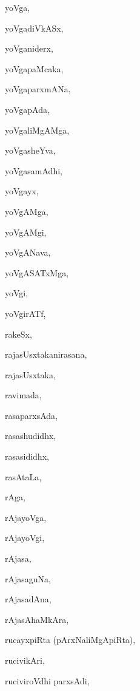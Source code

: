 \begin{multicols}{2}
{yoVga}, \pageref{yoVga}

{yoVgadiVkASx}, \pageref{yoVgadiVkASx}

{yoVganiderx}, \pageref{yoVganiderx}

{yoVgapaMcaka}, \pageref{yoVgapaMcaka}

{yoVgaparxmANa}, \pageref{yoVgaparxmANa}

{yoVgapAda}, \pageref{yoVgapAda}

{yoVgaliMgAMga}, \pageref{yoVgaliMgAMga}

{yoVgasheYva}, \pageref{yoVgasheYva}

{yoVgasamAdhi}, \pageref{yoVgasamAdhi}

{yoVgayx}, \pageref{yoVgayx}

{yoVgAMga}, \pageref{yoVgAMga}

{yoVgAMgi}, \pageref{yoVgAMgi}

{yoVgANava}, \pageref{yoVgANava}

{yoVgASATxMga}, \pageref{yoVgASATxMga}

{yoVgi}, \pageref{yoVgi}

{yoVgirATf}, \pageref{yoVgirATf}

{rakeSx}, \pageref{rakeSx}

{rajasUsxtakanirasana}, \pageref{rajasUsxtakanirasana}

{rajasUsxtaka}, \pageref{rajasUsxtaka}

{ravimada}, \pageref{ravimada}

{rasaparxsAda}, \pageref{rasaparxsAda}

{rasashudidhx}, \pageref{rasashudidhx}

{rasasididhx}, \pageref{rasasididhx}

{rasAtaLa}, \pageref{rasAtaLa}

{rAga}, \pageref{rAga}

{rAjayoVga}, \pageref{rAjayoVga}

{rAjayoVgi}, \pageref{rAjayoVgi}

{rAjasa}, \pageref{rAjasa}

{rAjasaguNa}, \pageref{rAjasaguNa}

{rAjasadAna}, \pageref{rAjasadAna}

{rAjasAhaMkAra}, \pageref{rAjasAhaMkAra}

{rucayxpiRta (pArxNaliMgApiRta)}, \pageref{rucayxpiRta (pArxNaliMgApiRta)}

{rucivikAri}, \pageref{rucivikAri}

{ruciviroVdhi parxsAdi}, \pageref{ruciviroVdhiparxsAdi}


\end{multicols}
